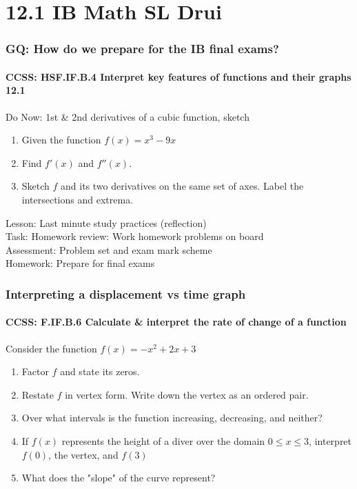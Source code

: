 \documentclass{beamer}
\begin{document}
  \section{12.1 IB Math SL Drui}
  \frame
  {
    \frametitle{GQ: How do we prepare for the IB final exams?}
    \framesubtitle{CCSS: HSF.IF.B.4 Interpret key features of functions and their graphs \qquad \alert{12.1}}

    \begin{block}{Do Now: 1st \& 2nd derivatives of a cubic function, sketch}
      \begin{enumerate}
      \item Given the function $f(x)=x^3-9x$
      \item Find $f'(x)$ and $f''(x)$.
      \item Sketch $f$ and its two derivatives on the same set of axes. Label the intersections and extrema.
      \end{enumerate}
   \end{block}
    Lesson: Last minute study practices (reflection) \\[5pt]
    Task: Homework review: Work homework problems on board\\%
    Assessment: Problem set and exam mark scheme\\%
    Homework: Prepare for final exams
  }

  \frame
  {
    \frametitle{Interpreting a displacement vs time graph}
    \framesubtitle{CCSS: F.IF.B.6 Calculate \& interpret the rate of change of a function}

    \begin{block}{Consider the function $f(x)=-x^2+2x+3$}
    \begin{enumerate}
        \item Factor $f$ and state its zeros.
        \item Restate $f$ in vertex form. Write down the vertex as an ordered pair.
        \item Over what intervals is the function increasing, decreasing, and neither?
        \item If $f(x)$ represents the height of a diver over the domain $0 \leq x \leq 3$, interpret $f(0)$, the vertex, and $f(3)$
        \item What does the "slope" of the curve represent?
    \end{enumerate}
    \end{block}
  }
\end{document}
